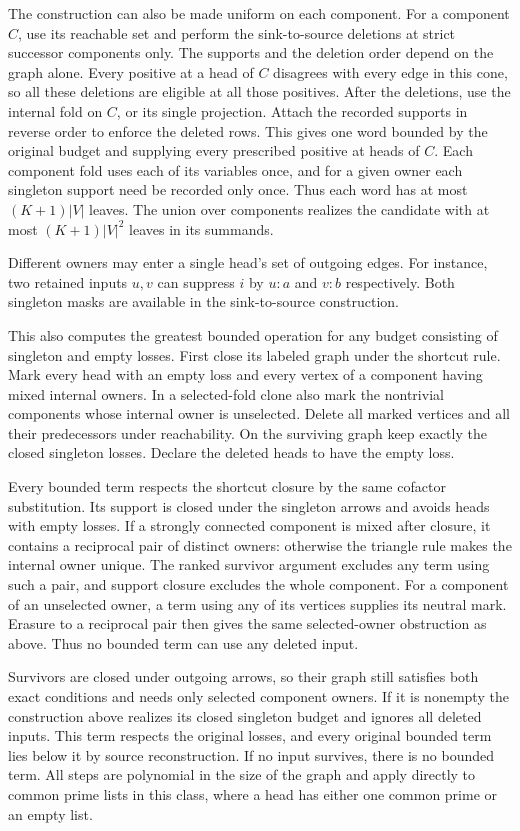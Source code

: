 The construction can also be made uniform on each
component. For a component $C$, use its reachable
set and perform the sink-to-source deletions at
strict successor components only. The supports and
the deletion order depend on the graph alone. Every
positive at a head of $C$ disagrees with every edge
in this cone, so all these deletions are eligible at
all those positives. After the deletions, use the
internal fold on $C$, or its single projection.
Attach the recorded supports in reverse order to
enforce the deleted rows. This gives one word bounded
by the original budget and supplying every prescribed
positive at heads of $C$. Each component fold uses
each of its variables once, and for a given owner
each singleton support need be recorded only once.
Thus each word has at most $(K+1)|V|$ leaves.
The union over components realizes the candidate with
at most $(K+1)|V|^2$ leaves in its summands.

Different owners may enter a single head's set of
outgoing edges. For instance, two retained inputs
$u,v$ can suppress $i$ by $u{:}a$ and $v{:}b$
respectively. Both singleton masks are available
in the sink-to-source construction.

This also computes the greatest bounded operation for
any budget consisting of singleton and empty losses.
First close its labeled graph under the shortcut rule.
Mark every head with an empty loss and every vertex of
a component having mixed internal owners. In a
selected-fold clone also mark the nontrivial components
whose internal owner is unselected. Delete all marked
vertices and all their predecessors under reachability.
On the surviving graph keep exactly the closed singleton
losses. Declare the deleted heads to have the empty loss.

Every bounded term respects the shortcut closure by
the same cofactor substitution. Its support is closed
under the singleton arrows and avoids heads with empty
losses. If a strongly connected component is mixed after
closure, it contains a reciprocal pair of distinct owners:
otherwise the triangle rule makes the internal owner
unique. The ranked survivor argument excludes any term
using such a pair, and support closure excludes the whole
component. For a component of an unselected owner, a
term using any of its vertices supplies its neutral mark.
Erasure to a reciprocal pair then gives the same
selected-owner obstruction as above. Thus no bounded
term can use any deleted input.

Survivors are closed under outgoing arrows, so their
graph still satisfies both exact conditions and needs
only selected component owners. If it is nonempty the
construction above realizes its closed singleton budget
and ignores all deleted inputs. This term respects the
original losses, and every original bounded term lies
below it by source reconstruction. If no input survives,
there is no bounded term. All steps are polynomial in
the size of the graph and apply directly to common
prime lists in this class, where a head has either one
common prime or an empty list.

